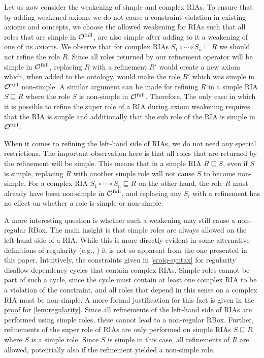 
Let us now consider the weakening of simple and complex RIAs. To ensure that by adding weakened axioms we do not cause a constraint violation in existing axioms and concepts, we choose the allowed weakening for RIAs such that all roles that are simple in ${\mathcal{O}^\textnormal{full}}$, are also simple after adding to it a weakening of one of its axioms. We observe that for complex RIAs $S_1 \circ \cdots \circ S_n \sqsubseteq R$ we should not refine the role $R$. Since all roles returned by our refinement operator will be simple in ${\mathcal{O}^\textnormal{full}}$, replacing $R$ with a refinement $R'$ would create a new axiom which, when added to the ontology, would make the role $R'$ which was simple in ${\mathcal{O}^\textnormal{full}}$ non-simple. A similar argument can be made for refining $R$ in a simple RIA $S \sqsubseteq R$ where the role $S$ is non-simple in ${\mathcal{O}^\textnormal{full}}$. Therefore, The only case in which it is possible to refine the super role of a RIA during axiom weakening requires that the RIA is simple and additionally that the sub role of the RIA is simple in ${\mathcal{O}^\textnormal{full}}$.

When it comes to refining the left-hand side of RIAs, we do not need any special restrictions. The important observation here is that all roles that are returned by the refinement will be simple. This means that in a simple RIA $R \sqsubseteq S$, even if $S$ is simple, replacing $R$ with another simple role will not cause $S$ to become non-simple. For a complex RIA $S_1 \circ \cdots \circ S_n \sqsubseteq R$ on the other hand, the role $R$ must already have been non-simple in ${\mathcal{O}^\textnormal{full}}$, and replacing any $S_i$ with a refinement has no effect on whether a role is simple or non-simple.

A more interesting question is whether such a weakening may still cause a non-regular RBox. The main insight is that simple roles are always allowed on the left-hand side of a RIA. While this is more directly evident in some alternative definitions of regularity (e.g., \cite{rudolph2011foundations}) it is not so apparent from the one presented in this paper. Intuitively, the constraints given in \cref{sroiq-syntax} for regularity disallow dependency cycles that contain complex RIAs. Simple roles cannot be part of such a cycle, since the cycle must contain at least one complex RIA to be a violation of the constraint, and all roles that depend in this sense on a complex RIA must be non-simple. A more formal justification for this fact is given in the \hyperref[proof:regularity]{proof} for \cref{lem:regularity}. Since all refinements of the left-hand side of RIAs are performed using simple roles, these cannot lead to a non-regular RBox. Further, refinements of the super role of RIAs are only performed on simple RIAs $S \sqsubseteq R$ where $S$ is a simple role. Since $S$ is simple in this case, all refinements of $R$ are allowed, potentially also if the refinement yielded a non-simple role.

